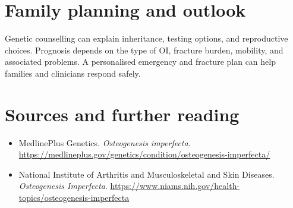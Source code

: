 \section*{Family planning and outlook}
Genetic counselling can explain inheritance, testing options, and reproductive choices. Prognosis depends on the type of OI, fracture burden, mobility, and associated problems. A personalised emergency and fracture plan can help families and clinicians respond safely.

\section*{Sources and further reading}
\begin{itemize}
\item MedlinePlus Genetics. \textit{Osteogenesis imperfecta}. \url{https://medlineplus.gov/genetics/condition/osteogenesis-imperfecta/}
\item National Institute of Arthritis and Musculoskeletal and Skin Diseases. \textit{Osteogenesis Imperfecta}. \url{https://www.niams.nih.gov/health-topics/osteogenesis-imperfecta}
\end{itemize}
